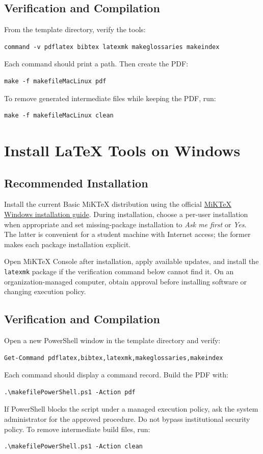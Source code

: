 \subsection{Verification and Compilation}
From the template directory, verify the tools:
\begin{verbatim}
command -v pdflatex bibtex latexmk makeglossaries makeindex
\end{verbatim}
Each command should print a path. Then create the PDF:
\begin{verbatim}
make -f makefileMacLinux pdf
\end{verbatim}
To remove generated intermediate files while keeping the PDF, run:
\begin{verbatim}
make -f makefileMacLinux clean
\end{verbatim}

\section{Install LaTeX Tools on Windows}
\subsection{Recommended Installation}
Install the current Basic MiKTeX distribution using the official
\href{https://miktex.org/howto/install-miktex}{MiKTeX Windows installation
guide}. During installation, choose a per-user installation when appropriate
and set missing-package installation to \emph{Ask me first} or \emph{Yes}.
The latter is convenient for a student machine with Internet access; the former
makes each package installation explicit.

Open MiKTeX Console after installation, apply available updates, and install
the \texttt{latexmk} package if the verification command below cannot find it.
On an organization-managed computer, obtain approval before installing software
or changing execution policy.

\subsection{Verification and Compilation}
Open a new PowerShell window in the template directory and verify:
\begin{verbatim}
Get-Command pdflatex,bibtex,latexmk,makeglossaries,makeindex
\end{verbatim}
Each command should display a command record. Build the PDF with:
\begin{verbatim}
.\makefilePowerShell.ps1 -Action pdf
\end{verbatim}
If PowerShell blocks the script under a managed execution policy, ask the
system administrator for the approved procedure. Do not bypass institutional
security policy. To remove intermediate build files, run:
\begin{verbatim}
.\makefilePowerShell.ps1 -Action clean
\end{verbatim}

